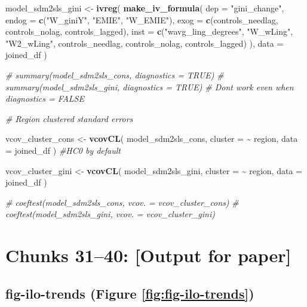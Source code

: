 \documentclass[
]{article}
\newenvironment{Shaded}{\begin{snugshade}}{\end{snugshade}}
\newcommand{\AttributeTok}[1]{\textcolor[rgb]{0.13,0.29,0.53}{#1}}
\newcommand{\CommentTok}[1]{\textcolor[rgb]{0.56,0.35,0.01}{\textit{#1}}}
\newcommand{\FunctionTok}[1]{\textcolor[rgb]{0.13,0.29,0.53}{\textbf{#1}}}
\newcommand{\NormalTok}[1]{#1}
\newcommand{\OtherTok}[1]{\textcolor[rgb]{0.56,0.35,0.01}{#1}}
\newcommand{\SpecialCharTok}[1]{\textcolor[rgb]{0.81,0.36,0.00}{\textbf{#1}}}
\newcommand{\StringTok}[1]{\textcolor[rgb]{0.31,0.60,0.02}{#1}}
\begin{document}
\begin{Shaded}
\begin{Highlighting}[]
\NormalTok{model\_sdm2sls\_gini }\OtherTok{\textless{}{-}} \FunctionTok{ivreg}\NormalTok{(}
  \FunctionTok{make\_iv\_formula}\NormalTok{(}
    \AttributeTok{dep =} \StringTok{"gini\_change"}\NormalTok{,}
    \AttributeTok{endog =} \FunctionTok{c}\NormalTok{(}\StringTok{"W\_giniY"}\NormalTok{, }\StringTok{"EMIE"}\NormalTok{, }\StringTok{"W\_EMIE"}\NormalTok{),}
    \AttributeTok{exog =} \FunctionTok{c}\NormalTok{(controls\_needlag, controls\_nolag, controls\_lagged),}
    \AttributeTok{inst =} \FunctionTok{c}\NormalTok{(}\StringTok{"wavg\_ling\_degrees"}\NormalTok{, }\StringTok{"W\_wLing"}\NormalTok{, }\StringTok{"W2\_wLing"}\NormalTok{, }
\NormalTok{             controls\_needlag, controls\_nolag, controls\_lagged)}
\NormalTok{  ),}
  \AttributeTok{data =}\NormalTok{ joined\_df}
\NormalTok{)}

\CommentTok{\# summary(model\_sdm2sls\_cons, diagnostics = TRUE)}
\CommentTok{\# summary(model\_sdm2sls\_gini,  diagnostics = TRUE)}
\CommentTok{\# Don\textquotesingle{}t work even when diagnostics = FALSE}



\CommentTok{\# Region clustered standard errors}

\NormalTok{vcov\_cluster\_cons }\OtherTok{\textless{}{-}} \FunctionTok{vcovCL}\NormalTok{(}
\NormalTok{  model\_sdm2sls\_cons,}
  \AttributeTok{cluster =} \SpecialCharTok{\textasciitilde{}}\NormalTok{ region,}
  \AttributeTok{data =}\NormalTok{ joined\_df}
\NormalTok{)}
\CommentTok{\#HC0 by default}

\NormalTok{vcov\_cluster\_gini }\OtherTok{\textless{}{-}} \FunctionTok{vcovCL}\NormalTok{(}
\NormalTok{  model\_sdm2sls\_gini,}
  \AttributeTok{cluster =} \SpecialCharTok{\textasciitilde{}}\NormalTok{ region,}
  \AttributeTok{data =}\NormalTok{ joined\_df}
\NormalTok{)}


\CommentTok{\# coeftest(model\_sdm2sls\_cons, vcov. = vcov\_cluster\_cons)}
\CommentTok{\# coeftest(model\_sdm2sls\_gini, vcov. = vcov\_cluster\_gini)}
\end{Highlighting}
\end{Shaded}

\newpage

\section*{Chunks 31--40: {[}Output for paper{]}}\label{chunks-3140-output-for-paper}

\subsection*{fig-ilo-trends (Figure \ref{fig:fig-ilo-trends})}\label{fig-ilo-trends-figure-reffigfig-ilo-trends}
\end{document}
